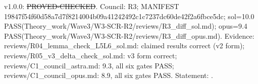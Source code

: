 \begin{theorem}\label{reg:W3-SCR_SCR-C}
\end{theorem}
\begin{statusbox}
 v1.0.0: \st{PROVED-CHECKED}. Council: R3; MANIFEST 19847f54f60d58a7d7f8214004b09a41242492c1c7237dc60de42f2a6fbce5dc; sol=10.0 PASS(Theory\_work/Wave3/W3-SCR-R2/reviews/R3\_diff\_sol.md); opus=9.4 PASS(Theory\_work/Wave3/W3-SCR-R2/reviews/R3\_diff\_opus.md). Evidence: reviews/R04\_lemma\_check\_L5L6\_sol.md: claimed results correct (v2 form); reviews/R05\_v3\_delta\_check\_sol.md: v3 form correct; reviews/C1\_council\_astra.md: 9.3, all six gates PASS; reviews/C1\_council\_opus.md: 8.9, all six gates PASS. Statement: .
\end{statusbox}
